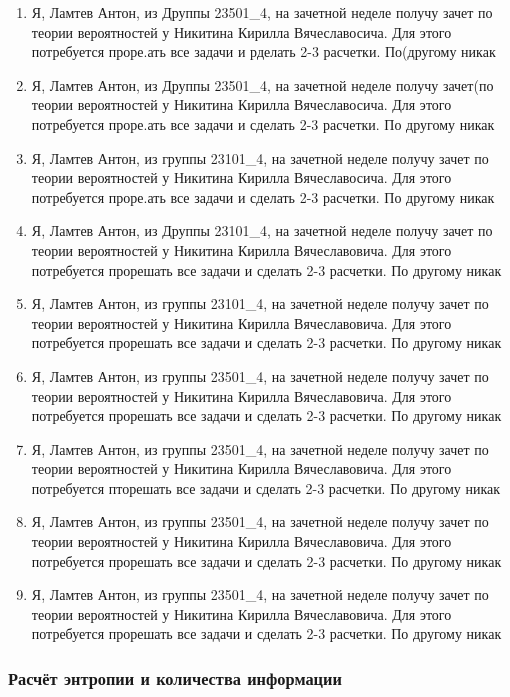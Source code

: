\begin{itemize}
\begin{enumerate}
		\item
		Я, Ламтев Антон, из Друппы 23501\_4, на зачетной неделе получу зачет по теории вероятностей у Никитина Кирилла Вячеславосича. Для этого потребуется проре.ать все задачи и рделать 2-3 расчетки. По(другому никак
		\item
		Я, Ламтев Антон, из Друппы 23501\_4, на зачетной неделе получу зачет(по теории вероятностей у Никитина Кирилла Вячеславосича. Для этого потребуется проре.ать все задачи и сделать 2-3 расчетки. По другому никак
		\item
		Я, Ламтев Антон, из группы 23101\_4, на зачетной неделе получу зачет по теории вероятностей у Никитина Кирилла Вячеславосича. Для этого потребуется проре.ать все задачи и сделать 2-3 расчетки. По другому никак
		\item
		Я, Ламтев Антон, из Друппы 23101\_4, на зачетной неделе получу зачет по теории вероятностей у Никитина Кирилла Вячеславовича. Для этого потребуется прорешать все задачи и сделать 2-3 расчетки. По другому никак
		\item
		Я, Ламтев Антон, из группы 23101\_4, на зачетной неделе получу зачет по теории вероятностей у Никитина Кирилла Вячеславовича. Для этого потребуется прорешать все задачи и сделать 2-3 расчетки. По другому никак
		\item
		Я, Ламтев Антон, из группы 23501\_4, на зачетной неделе получу зачет по теории вероятностей у Никитина Кирилла Вячеславовича. Для этого потребуется прорешать все задачи и сделать 2-3 расчетки. По другому никак
		\item
		Я, Ламтев Антон, из группы 23501\_4, на зачетной неделе получу зачет по теории вероятностей у Никитина Кирилла Вячеславовича. Для этого потребуется пторешать все задачи и сделать 2-3 расчетки. По другому никак
		\item
		Я, Ламтев Антон, из группы 23501\_4, на зачетной неделе получу зачет по теории вероятностей у Никитина Кирилла Вячеславовича. Для этого потребуется прорешать все задачи и сделать 2-3 расчетки. По другому никак
		\item
		Я, Ламтев Антон, из группы 23501\_4, на зачетной неделе получу зачет по теории вероятностей у Никитина Кирилла Вячеславовича. Для этого потребуется прорешать все задачи и сделать 2-3 расчетки. По другому никак

	\end{enumerate}
		
\end{itemize}

\subsubsection{Расчёт энтропии и количества информации}

